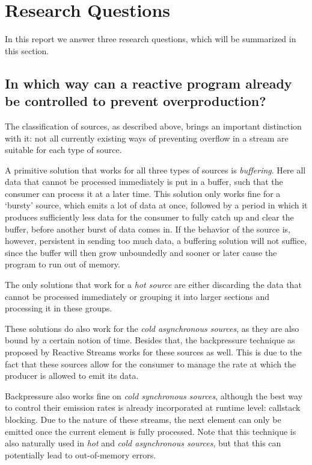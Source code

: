 \section{Research Questions}
In this report we answer three research questions, which will be summarized in this section.

\subsection*{In which way can a reactive program already be controlled to prevent overproduction?}
The classification of sources, as described above, brings an important distinction with it: not all currently existing ways of preventing overflow in a stream are suitable for each type of source.

A primitive solution that works for all three types of sources is \textit{buffering}. Here all data that cannot be processed immediately is put in a buffer, such that the consumer can process it at a later time. This solution only works fine for a `bursty' source, which emits a lot of data at once, followed by a period in which it produces sufficiently less data for the consumer to fully catch up and clear the buffer, before another burst of data comes in. If the behavior of the source is, however, persistent in sending too much data, a buffering solution will not suffice, since the buffer will then grow unboundedly and sooner or later cause the program to run out of memory.

The only solutions that work for a \textit{hot source} are either discarding the data that cannot be processed immediately or grouping it into larger sections and processing it in these groups.

These solutions do also work for the \textit{cold asynchronous sources}, as they are also bound by a certain notion of time. Besides that, the backpressure technique as proposed by Reactive Streams works for these sources as well. This is due to the fact that these sources allow for the consumer to manage the rate at which the producer is allowed to emit its data.

Backpressure also works fine on \textit{cold synchronous sources}, although the best way to control their emission rates is already incorporated at runtime level: callstack blocking. Due to the nature of these streams, the next element can only be emitted once the current element is fully processed. Note that this technique is also naturally used in \textit{hot} and \textit{cold asynchronous sources}, but that this can potentially lead to out-of-memory errors.

